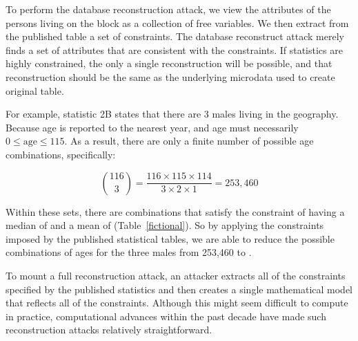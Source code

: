 \documentclass[runningheads]{llncs}
\begin{document}
To perform the database reconstruction attack, we view the attributes
of the persons living on the block as a collection of 
free variables. We then extract from the published table a set of
constraints. The database reconstruct attack merely finds a set of
attributes that are consistent with the constraints. If statistics are
highly constrained, the only a single reconstruction will be
possible, and that reconstruction should be the same as the underlying
microdata used to create original table.

For example, statistic 2B states that there are 3 males living in the
geography.  Because age is reported to the nearest year, and
age must necessarily $0 \le \textrm{age} \le 115$. As a result, there
are only a finite number of possible age combinations, specifically:

\[ \binom{116}{3}=\frac{116 \times 115 \times 114}{3 \times 2 \times
  1} = 253,460 \]


Within these sets, there are \mycount{} combinations that satisfy the
constraint of having a median of \mymedian{} and a mean of \mymean{}
(Table~\ref{fictional}). So by applying the constraints imposed by the
published statistical tables, we are able to reduce the possible
combinations of ages for the three males from 253,460 to \mycount.

To mount a full reconstruction attack, an attacker extracts all of the
constraints specified by the published statistics and then creates a
single mathematical model that reflects all of the
constraints.  
Although this might seem difficult to compute in practice,
computational advances within the past decade have made such
reconstruction attacks relatively straightforward.
\end{document}
